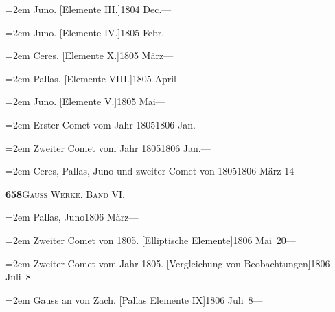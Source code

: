 \documentclass[12pt,a4paper]{article}
\begin{document}
{{{\vspace{0.5mm}
\noindent\hangindent=2em
Juno. [Elemente III.]\hfill 1804 Dec.\quad ---

\vspace{0.5mm}
\noindent\hangindent=2em
Juno. [Elemente IV.]\hfill 1805 Febr.\quad ---

\vspace{0.5mm}
\noindent\hangindent=2em
Ceres. [Elemente X.]\hfill 1805 M\"arz\quad ---

\vspace{0.5mm}
\noindent\hangindent=2em
Pallas. [Elemente VIII.]\hfill 1805 April\quad ---

\vspace{0.5mm}
\noindent\hangindent=2em
Juno. [Elemente V.]\hfill 1805 Mai\quad ---

\vspace{0.5mm}
\noindent\hangindent=2em
Erster Comet vom Jahr 1805\hfill 1806 Jan.\quad ---

\vspace{0.5mm}
\noindent\hangindent=2em
Zweiter Comet vom Jahr 1805\hfill 1806 Jan.\quad ---

\vspace{0.5mm}
\noindent\hangindent=2em
Ceres, Pallas, Juno und zweiter Comet von 1805\hfill 1806 M\"arz 14\quad ---

\newpage

\begin{center}\small\textbf{658}\quad\textsc{Gauss Werke. Band VI.}\end{center}

\vspace{0.3cm}

{\small
\noindent\hangindent=2em
Pallas, Juno\hfill 1806 M\"arz\quad ---

\vspace{0.5mm}
\noindent\hangindent=2em
Zweiter Comet von 1805. [Elliptische Elemente]\hfill 1806 Mai\ 20\quad ---

\vspace{0.5mm}
\noindent\hangindent=2em
Zweiter Comet vom Jahr 1805. [Vergleichung von Beobachtungen]\hfill 1806 Juli\ 8\quad ---

\vspace{0.5mm}
\noindent\hangindent=2em
Gauss an von Zach. [Pallas Elemente IX]\hfill 1806 Juli\ 8\quad ---

}}}}
\end{document}
